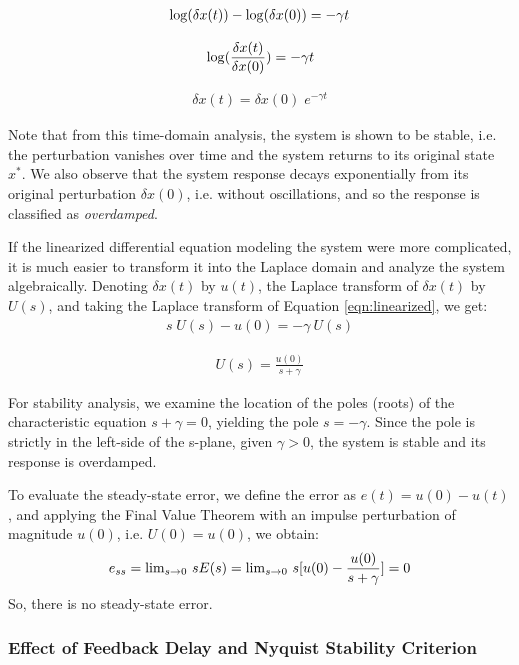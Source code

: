 \documentclass{article}
\def\lg{{\rm log}}
\def\lm{{\rm lim}}
\begin{document}
\begin{eqnarray*}
\lg (\delta x(t)) -  \lg (\delta x(0)) = - \gamma t
\end{eqnarray*}

\begin{eqnarray*}
\lg (\frac{\delta x(t)}{\delta x(0)})  = - \gamma t  
\end{eqnarray*}

\begin{eqnarray*}
\delta x(t)  = \delta x(0)\; e^{- \gamma t}
\end{eqnarray*}

Note that from this time-domain analysis, the system is shown to be stable, i.e. the perturbation vanishes over time and the system returns to its original state $x^*$. We also observe that the system response decays exponentially from its original perturbation $\delta x(0)$, i.e. without oscillations, and so the response is classified as {\em overdamped}.

If the linearized differential equation modeling the system were more complicated, it is much easier to transform it into the Laplace domain and analyze the system algebraically. 
Denoting $\delta x(t)$ by $u(t)$, the Laplace transform of $\delta x(t)$ by $U(s)$, and taking the Laplace transform of Equation \ref{eqn:linearized}, we get:
\begin{eqnarray*}
s\; U(s) - u(0) = - \gamma\ U(s)
\end{eqnarray*}

\begin{eqnarray*}
U(s)  = \frac{u(0)}{s + \gamma }  
\end{eqnarray*}

For stability analysis, we examine the location of the poles (roots) of the characteristic equation $s + \gamma = 0$, yielding the pole $s = -\gamma$. Since the pole is strictly in the left-side of the s-plane, given $\gamma > 0$, the system is stable and its response is overdamped.

To evaluate the steady-state error, we define the error as $e(t) = u(0) - u(t)$, and applying the Final Value Theorem with an impulse perturbation of magnitude $u(0)$, i.e. $U(0)=u(0)$, we obtain:
\begin{eqnarray*}
e_{ss} = \lm_{s \rightarrow 0}\ s E(s) = \lm_{s \rightarrow 0}\ s [u(0) - \frac{u(0)}{s + \gamma } ] = 0
\end{eqnarray*}
So, there is no steady-state error.

\subsubsection{Effect of Feedback Delay and Nyquist Stability Criterion}
\end{document}
